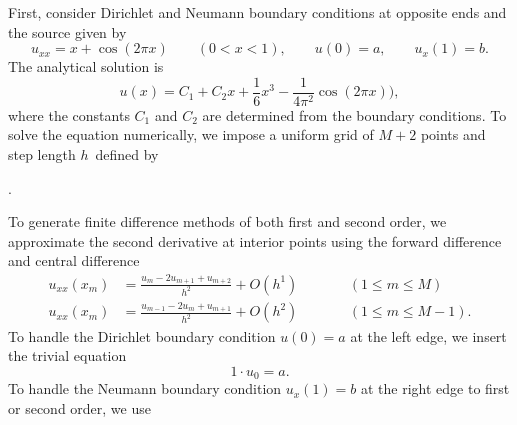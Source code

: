 First, consider Dirichlet and Neumann boundary conditions at opposite ends and the source given by
\begin{equation*}
u_{xx} = x + \cos(2 \pi x) \qquad (0 < x < 1), \qquad u(0) = a, \qquad u_x(1) = b.
\end{equation*}
The analytical solution is
\begin{equation*}
u(x) = C_1 + C_2 x + \frac{1}{6}x^3 - \frac{1}{4 \pi^2}\cos(2 \pi x)),
\end{equation*}
where the constants $C_1$ and $C_2$ are determined from the boundary conditions.
To solve the equation numerically, we impose a uniform grid of $M+2$ points and step length $h$ defined by
\begin{center}
.
\end{center}
To generate finite difference methods of both first and second order, we approximate the second derivative at interior points using the forward difference and central difference
\begin{equation*}
\begin{aligned}
u_{xx}(x_m) & = \frac{u_m-2u_{m+1}+u_{m+2}}{h^2} + O(h^1) \qquad && (1 \leq m \leq M) \\
u_{xx}(x_m) & = \frac{u_{m-1}-2u_m+u_{m+1}}{h^2} + O(h^2) \qquad && (1 \leq m \leq M-1).
\end{aligned}
\end{equation*}
To handle the Dirichlet boundary condition $u(0) = a$ at the left edge, we insert the trivial equation
\begin{equation*}
1 \cdot u_0 = a.
\end{equation*}
To handle the Neumann boundary condition $u_x(1) = b$ at the right edge to first or second order, we use
